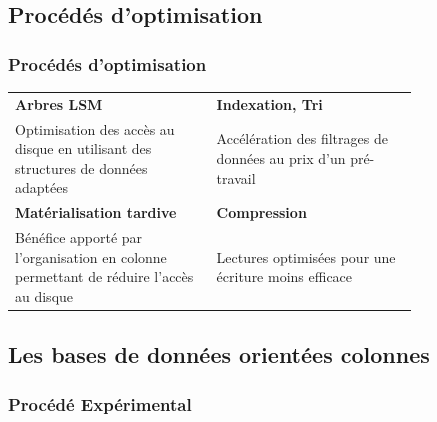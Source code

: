 \documentclass[a4paper,12pt]{beamer}
\begin{document}
\subsection{Procédés d'optimisation}
\begin{frame}
    \frametitle{Procédés d'optimisation}


    \setlength{\tabcolsep}{8pt} %
\renewcommand{\arraystretch}{2} %

\begin{center}
\begin{tabular}{|p{0.4\linewidth}|p{0.4\linewidth}|}
\hline
\textbf{Arbres LSM} & \textbf{Indexation, Tri} \\
Optimisation des accès au disque en utilisant des structures de données adaptées &
Accélération des filtrages de données au prix d'un pré-travail \\
\hline
\textbf{Matérialisation tardive} & \textbf{Compression} \\
Bénéfice apporté par l'organisation en colonne permettant de réduire l'accès au disque &
Lectures optimisées pour une écriture moins efficace\\
\hline
\end{tabular}
\end{center}
    
    \end{frame}

\subsection{Les bases de données orientées colonnes}
\begin{frame}
    \frametitle{Procédé Expérimental}

    \begin{center}
\end{center}
   \end{frame}
\end{document}

